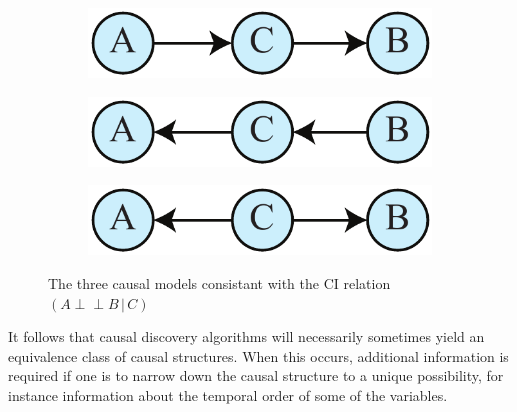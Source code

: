 \documentclass[letterpaper,onecolumn,nofootinbib]{revtex4}
\def\indep{\perp\!\!\!\!\perp}
\begin{document}
\begin{figure}[h]
        \begin{subfigure}[b]{0.2\textwidth}
                	\centering
                	\includegraphics[width=\textwidth]{markovchain1}
		\caption{}
                	\label{fig:markovchain1}
        \end{subfigure}
        \quad\quad
        \begin{subfigure}[b]{0.2\textwidth}
                	\centering
                	\includegraphics[width=\textwidth]{markovchain2}
		\caption{}
                	\label{fig:markovchain2}
        \end{subfigure}
        \quad
        \begin{subfigure}[b]{0.2\textwidth}
                	\centering
                	\includegraphics[width=\textwidth]{markovchain3}
		\caption{}
                	\label{fig:markovchain3}
        \end{subfigure}
 \caption{The three causal models consistant with the CI relation $(A\indep B\,|\,C)$}
        \label{fig:markovchain}
\end{figure}

It follows that causal discovery algorithms will necessarily sometimes yield an equivalence class of
causal structures.  When this occurs, additional information is required if one is to narrow down the causal structure to a unique possibility, for instance information about the temporal order of some of the variables.
\end{document}
